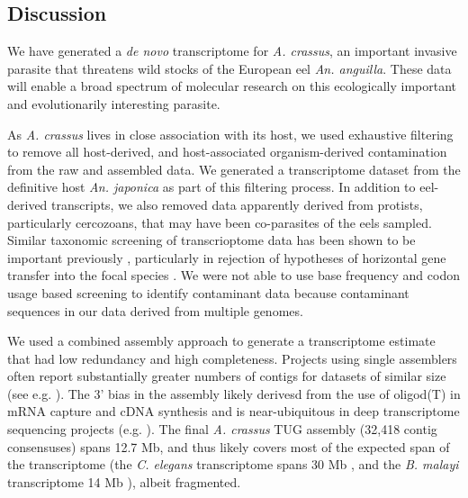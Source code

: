 \documentclass[10pt]{bmc_article}
\newenvironment{bmcformat}{\begin{raggedright}\baselineskip20pt\sloppy\setboolean{publ}{false}}{\end{raggedright}\baselineskip20pt\sloppy}
\begin{document}
\begin{bmcformat}
\section*{Discussion}

We have generated a \textit{de novo} transcriptome for
\textit{A. crassus}, an important invasive parasite that threatens
wild stocks of the European eel \textit{An. anguilla}. These data will
enable a broad spectrum of molecular research on this ecologically
important and evolutionarily interesting parasite.

As \textit{A. crassus} lives in close association with its host, we
used exhaustive filtering to remove all host-derived, and
host-associated organism-derived contamination from the raw and
assembled data. We generated a transcriptome dataset from the
definitive host \textit{An. japonica} as part of this filtering
process. In addition to eel-derived transcripts, we also removed data
apparently derived from protists, particularly cercozoans, that may
have been co-parasites of the eels sampled. Similar taxonomic
screening of transcrioptome data has been shown to be important
previously \cite{pmid21138572}, particularly in rejection of
hypotheses of horizontal gene transfer into the focal species
\cite{pmid20386959}. We were not able to use base frequency and codon
usage based screening to identify contaminant data \cite{pmid20034392,
  pmid17218127} because contaminant sequences in our data derived from
multiple genomes.


We used a combined assembly approach \cite{pmid20950480} to generate a
transcriptome estimate that had low redundancy and high
completeness. Projects using single assemblers often report
substantially greater numbers of contigs for datasets of similar size
(see e.g. \cite{pmid21364769}). The 3’ bias in the assembly likely
derivesd from the use of oligod(T) in mRNA capture and cDNA synthesis
and is near-ubiquitous in deep transcriptome sequencing projects (e.g.
\cite{pmid20331785}). The final \textit{A. crassus} TUG assembly
(32,418 contig consensuses) spans 12.7 Mb, and thus likely covers most
of the expected span of the transcriptome (the \textit{C. elegans}
transcriptome spans 30 Mb \cite{pmid9851916}, and the
\textit{B. malayi} transcriptome 14 Mb \cite{ghedin_draft_2007}),
albeit fragmented.


\end{bmcformat}
\end{document}
